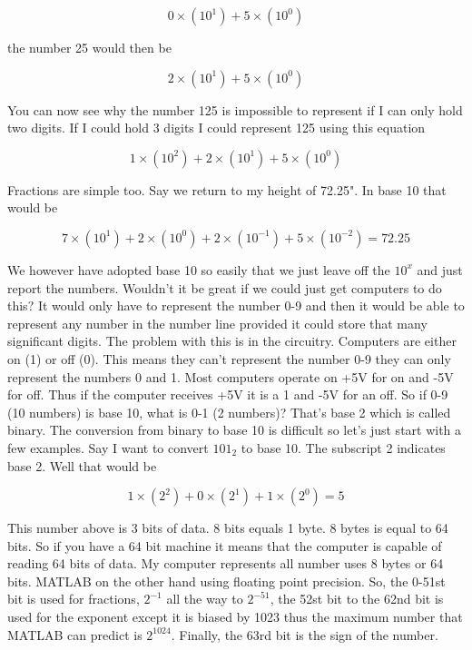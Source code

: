 \begin{enumerate}
    \begin{equation}
      0 \times (10^1) + 5 \times (10^0)
    \end{equation}

    the number 25 would then be

    \begin{equation}
      2 \times (10^1) + 5 \times (10^0)
    \end{equation}

    You can now see why the number 125 is impossible to represent if I
    can only hold two digits. If I could hold 3 digits I could
    represent 125 using this equation

    \begin{equation}
      1 \times (10^2) + 2 \times (10^1) + 5 \times (10^0)
    \end{equation}

    Fractions are simple too. Say we return to my height of 72.25". In
    base 10 that would be 

    \begin{equation}
      7 \times (10^1) + 2 \times (10^0) + 2 \times (10^{-1}) + 5
      \times (10^{-2}) = 72.25
    \end{equation}

    We however have adopted base 10 so easily that we just leave off
    the $10^x$ and just report the numbers. Wouldn't it be great if we
    could just get computers to do this? It would only have to
    represent the number 0-9 and then it would be able to represent
    any number in the number line provided it could store that many
    significant digits. The problem with this is in the
    circuitry. Computers are either on (1) or off (0). This means they
    can't represent the number 0-9 they can only represent the numbers
    0 and 1. Most computers operate on +5V for on and -5V for
    off. Thus if the computer receives +5V it is a 1 and -5V for an
    off. So if 0-9 (10 numbers) is base 10, what is 0-1 (2 numbers)?
    That's base 2 which is called binary. The conversion from binary
    to base 10 is difficult so let's just start with a few
    examples. Say I want to convert $101_2$ to base 10. The subscript
    2 indicates base 2. Well that would be

    \begin{equation}
      1 \times (2^2) + 0 \times (2^1) + 1 \times (2^0) = 5
    \end{equation}

    This number above is 3 bits of data. 8 bits equals 1 byte. 8
    bytes is equal to 64 bits. So if you have a 64 bit machine it
    means that the computer is capable of reading 64 bits of data. My
    computer represents all number uses 8 bytes or 64 bits. MATLAB on
    the other hand using floating point precision. So, the 0-51st bit
    is used for fractions, $2^{-1}$ all the way to $2^{-51}$, the 52st bit to
    the 62nd bit is used for the exponent except it is biased by
    1023 thus the maximum number that MATLAB can predict is
    $2^{1024}$. Finally, the 63rd bit is the sign of the number. 


\end{enumerate}
